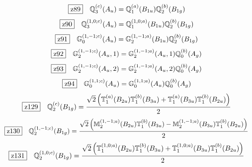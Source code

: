 \documentclass[fleqn,10pt,landscape]{jsarticle}
\begin{document}
\begin{dmath*}
\hspace*{3mm}\fbox{z89}\quad \mathbb{Q}_{3}^{(c)}(A_{u})=\mathbb{Q}_{1}^{(a)}(B_{1u}) \mathbb{Q}_{2}^{(b)}(B_{1g})
\end{dmath*}
\begin{dmath*}
\hspace*{3mm}\fbox{z90}\quad \mathbb{Q}_{3}^{(1,0;c)}(A_{u})=\mathbb{Q}_{1}^{(1,0;a)}(B_{1u}) \mathbb{Q}_{2}^{(b)}(B_{1g})
\end{dmath*}
\begin{dmath*}
\hspace*{3mm}\fbox{z91}\quad \mathbb{G}_{0}^{(1,-1;c)}(A_{u})=\mathbb{G}_{2}^{(1,-1;a)}(B_{1u}) \mathbb{Q}_{2}^{(b)}(B_{1g})
\end{dmath*}
\begin{dmath*}
\hspace*{3mm}\fbox{z92}\quad \mathbb{G}_{2}^{(1,-1;c)}(A_{u},1)=\mathbb{G}_{2}^{(1,-1;a)}(A_{u},1) \mathbb{Q}_{0}^{(b)}(A_{g})
\end{dmath*}
\begin{dmath*}
\hspace*{3mm}\fbox{z93}\quad \mathbb{G}_{2}^{(1,-1;c)}(A_{u},2)=\mathbb{G}_{2}^{(1,-1;a)}(A_{u},2) \mathbb{Q}_{0}^{(b)}(A_{g})
\end{dmath*}
\begin{dmath*}
\hspace*{3mm}\fbox{z94}\quad \mathbb{G}_{0}^{(1,1;c)}(A_{u})=\mathbb{G}_{0}^{(1,1;a)}(A_{u}) \mathbb{Q}_{0}^{(b)}(A_{g})
\end{dmath*}
\begin{dmath*}
\hspace*{3mm}\fbox{z129}\quad \mathbb{Q}_{2}^{(c)}(B_{1g})=\frac{\sqrt{2} \left(\mathbb{T}_{1}^{(a)}(B_{2u}) \mathbb{T}_{1}^{(b)}(B_{3u}) + \mathbb{T}_{1}^{(a)}(B_{3u}) \mathbb{T}_{1}^{(b)}(B_{2u})\right)}{2}
\end{dmath*}
\begin{dmath*}
\hspace*{3mm}\fbox{z130}\quad \mathbb{Q}_{2}^{(1,-1;c)}(B_{1g})=\frac{\sqrt{2} \left(\mathbb{M}_{2}^{(1,-1;a)}(B_{2u}) \mathbb{T}_{1}^{(b)}(B_{3u}) - \mathbb{M}_{2}^{(1,-1;a)}(B_{3u}) \mathbb{T}_{1}^{(b)}(B_{2u})\right)}{2}
\end{dmath*}
\begin{dmath*}
\hspace*{3mm}\fbox{z131}\quad \mathbb{Q}_{2}^{(1,0;c)}(B_{1g})=\frac{\sqrt{2} \left(\mathbb{T}_{1}^{(1,0;a)}(B_{2u}) \mathbb{T}_{1}^{(b)}(B_{3u}) + \mathbb{T}_{1}^{(1,0;a)}(B_{3u}) \mathbb{T}_{1}^{(b)}(B_{2u})\right)}{2}
\end{dmath*}
\end{document}
